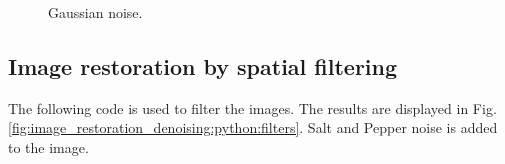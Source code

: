 \begin{figure}[H]
 \centering\caption{Gaussian noise.}%
 \hfill
\vspace*{-8pt}%
  \label{fig:image_restoration_denoising:python:hist_gauss}%
\end{figure}

\subsection{Image restoration by spatial filtering}
The following code is used to filter the images. The results are displayed in Fig.\ref{fig:image_restoration_denoising:python:filters}. Salt and Pepper noise is added to the image.

